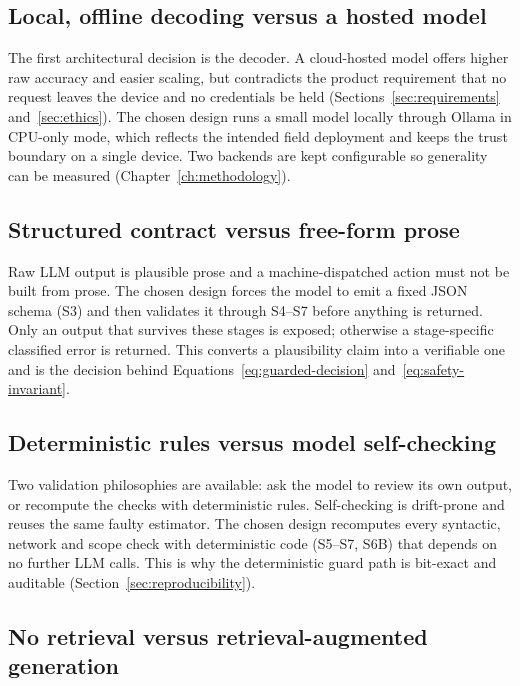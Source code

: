 \subsection*{Local, offline decoding versus a hosted model}

The first architectural decision is the decoder. A cloud-hosted model offers
higher raw accuracy and easier scaling, but contradicts the product
requirement that no request leaves the device and no credentials be held
(Sections~\ref{sec:requirements} and~\ref{sec:ethics}). The chosen design runs
a small model locally through Ollama in CPU-only mode, which reflects the
intended field deployment and keeps the trust boundary on a single device. Two
backends are kept configurable so generality can be measured
(Chapter~\ref{ch:methodology}).

\subsection*{Structured contract versus free-form prose}

Raw LLM output is plausible prose and a machine-dispatched action must not be
built from prose. The chosen design forces the model to emit a fixed JSON
schema (S3) and then validates it through S4--S7 before anything is returned.
Only an output that survives these stages is exposed; otherwise a
stage-specific classified error is returned. This converts a plausibility claim
into a verifiable one and is the decision behind
Equations~\ref{eq:guarded-decision} and~\ref{eq:safety-invariant}.

\subsection*{Deterministic rules versus model self-checking}

Two validation philosophies are available: ask the model to review its own
output, or recompute the checks with deterministic rules. Self-checking is
drift-prone and reuses the same faulty estimator. The chosen design recomputes
every syntactic, network and scope check with deterministic code (S5--S7,
S6B) that depends on no further LLM calls. This is why the deterministic guard
path is bit-exact and auditable (Section~\ref{sec:reproducibility}).

\subsection*{No retrieval versus retrieval-augmented generation}

